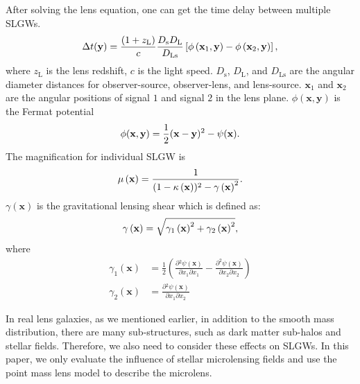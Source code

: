 \documentclass[fleqn,usenatbib]{mnras}
\begin{document}
After solving the lens equation, one can get the time delay between multiple SLGWs.
\begin{equation}
\label{eq;t-d}
\Delta t(\mathbf{y})=\frac{\left(1+z_{\mathrm{L}}\right)}{c} \frac{D_{\mathrm{s}} D_{\mathrm{L}}}{D_{\mathrm{Ls}}}\left[\phi\left(\mathbf{x}_{1}, \mathbf{y}\right)-\phi\left(\mathbf{x}_{2}, \mathbf{y}\right)\right] \\,
\end{equation}
where $z_\mathrm{L}$ is the lens redshift, $c$ is the light speed.
$D_\mathrm{s}$, $D_\mathrm{L}$, and $D_\mathrm{Ls}$ are the angular diameter distances for observer-source, observer-lens, and lens-source.
$\mathbf{x}_1$ and $\mathbf{x}_2$ are the angular positions of signal $1$ and signal $2$ in the lens plane.
$\phi\left(\mathbf{x}, \mathbf{y}\right)$ is the Fermat potential
\begin{equation}
\phi(\mathbf{x}, \mathbf{y})=\frac{1}{2}(\mathbf{x}-\mathbf{y})^{2}-\psi(\mathbf{x}) \\.
\end{equation}
The magnification for individual SLGW is
\begin{equation}
\mu\left(\mathbf{x}\right) = \frac{1}{(1-\kappa\left(\mathbf{x}\right))^2 - \gamma\left(\mathbf{x}\right)^2} \\.
\end{equation}
$\gamma\left(\mathbf{x}\right)$ is the gravitational lensing shear which is defined as:
\begin{equation}
\gamma\left(\mathbf{x}\right) = \sqrt{\gamma_{1}\left(\mathbf{x}\right)^{2}+\gamma_{2}\left(\mathbf{x}\right)^{2}} \\,
\end{equation}
where
\begin{equation}
\begin{aligned}
\gamma_{1}\left(\mathbf{x}\right) & =\frac{1}{2}\left(\frac{\partial{^2\psi\left(\mathbf{x}\right)}}{\partial{x_1}\partial{x_1}}-\frac{\partial^2{\psi\left(\mathbf{x}\right)}}{\partial{x_2}\partial{x_2}}\right) 
\\ 
\gamma_{2}\left(\mathbf{x}\right) & =\frac{\partial{^2\psi\left(\mathbf{x}\right)}}{\partial{x_1}\partial{x_2}}
\end{aligned}
\end{equation}

In real lens galaxies, as we mentioned earlier, in addition to the smooth mass distribution, there are many sub-structures, such as dark matter sub-halos and stellar fields.
Therefore, we also need to consider these effects on SLGWs.
In this paper, we only evaluate the influence of stellar microlensing fields and use the point mass lens model to describe the microlens.
\end{document}
